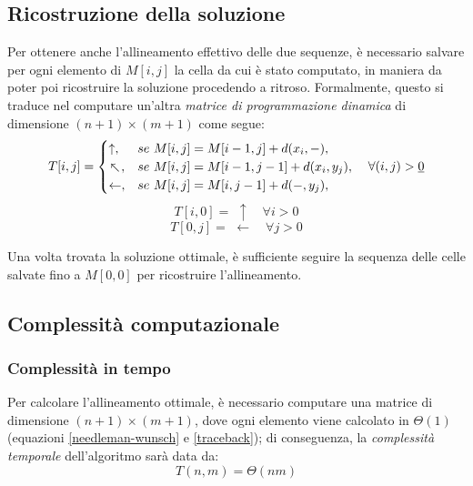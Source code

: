 \subsection{Ricostruzione della soluzione}
\label{subsection:traceback}
    Per ottenere anche l'allineamento effettivo delle due sequenze, è necessario salvare per ogni elemento di $M[i, j]$ la cella da cui è stato computato, in maniera da poter poi ricostruire la soluzione procedendo a ritroso. Formalmente, questo si traduce nel computare un'altra \emph{matrice di programmazione dinamica} di dimensione $(n + 1) \times (m + 1)$ come segue:
   \begin{equation}
        T[i, j] = \begin{cases}
            \uparrow, & se \, \, M[i, j] =  M[i-1, j] + d(x_i, -), \\
            \rotatebox[origin=c]{45}{$\uparrow$}, & se \, \, M[i, j] =  M[i-1, j-1] + d(x_i, y_j), \\
            \leftarrow, & se \, \, M[i, j] =  M[i, j-1] + d(-, y_j), \\
        \end{cases} \quad \forall (i, j) > \underline{0}
        \label{traceback}
    \end{equation}
\centering
    $$
        T[i, 0] = \, \, \uparrow \quad \forall i > 0
    $$
    $$
        T[0, j] = \, \, \leftarrow \quad \forall j > 0
    $$
    
\raggedright
    Una volta trovata la soluzione ottimale, è sufficiente seguire la sequenza delle celle salvate fino a $M[0, 0]$ per ricostruire l'allineamento.

\raggedright
\subsection{Complessità computazionale}
\label{section:needleman-wunsch_complexity}
\subsubsection{Complessità in tempo}
    Per calcolare l'allineamento ottimale, è necessario computare una matrice di dimensione $(n + 1) \times (m + 1)$, dove ogni elemento viene calcolato in $\Theta(1)$ (equazioni \ref{needleman-wunsch} e \ref{traceback}); di conseguenza, la \emph{complessità temporale} dell'algoritmo sarà data da:
    \begin{equation*}
        T(n, m) = \Theta(nm)
    \end{equation*}

